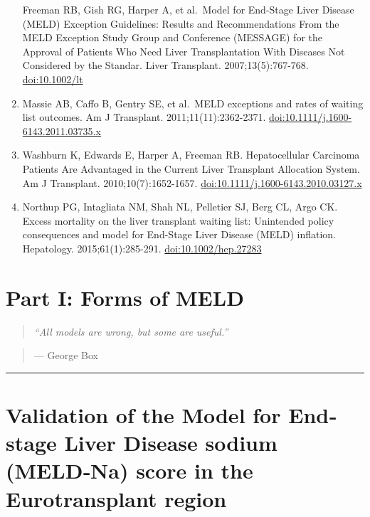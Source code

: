 \documentclass[11pt,english,]{book} %
\begin{document}
\begin{enumerate}
  Freeman RB, Gish RG, Harper A, et al.~Model for End-Stage Liver Disease (MELD) Exception Guidelines: Results and Recommendations From the MELD Exception Study Group and Conference (MESSAGE) for the Approval of Patients Who Need Liver Transplantation With Diseases Not Considered by the Standar. Liver Transplant. 2007;13(5):767-768. \url{doi:10.1002/lt}
\item
  Massie AB, Caffo B, Gentry SE, et al.~MELD exceptions and rates of waiting list outcomes. Am J Transplant. 2011;11(11):2362-2371. \url{doi:10.1111/j.1600-6143.2011.03735.x}
\item
  Washburn K, Edwards E, Harper A, Freeman RB. Hepatocellular Carcinoma Patients Are Advantaged in the Current Liver Transplant Allocation System. Am J Transplant. 2010;10(7):1652-1657. \url{doi:10.1111/j.1600-6143.2010.03127.x}
\item
  Northup PG, Intagliata NM, Shah NL, Pelletier SJ, Berg CL, Argo CK. Excess mortality on the liver transplant waiting list: Unintended policy consequences and model for End-Stage Liver Disease (MELD) inflation. Hepatology. 2015;61(1):285-291. \url{doi:10.1002/hep.27283}
\end{enumerate}

\newpage
\linespread{1.213}
\normalsize
\thispagestyle{plain}

\mbox{}


\pagecolor{black}
\color{white}

\hypertarget{part-i-forms-of-meld}{%
\chapter*{Part I: Forms of MELD}\label{part-i-forms-of-meld}}


\begin{quote}
\emph{``All models are wrong, but some are useful.''}
\end{quote}

\begin{quote}
--- George Box
\end{quote}

\begin{center}\rule{0.5\linewidth}{0.5pt}\end{center}

\newpage

\hypertarget{chap-meldna}{%
\chapter{Validation of the Model for End‐stage Liver Disease sodium (MELD‐Na) score in the Eurotransplant region}\label{chap-meldna}}
\end{document}
